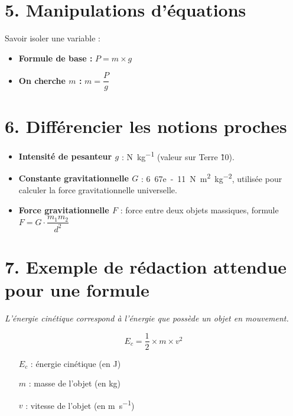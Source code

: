 \documentclass[12pt]{article}
\begin{document}
\section*{5. Manipulations d'équations}
Savoir isoler une variable :
\begin{itemize}[label=--]
  \item \textbf{Formule de base :} $P = m \times g$
  \item \textbf{On cherche $m$ :} \quad $m = \dfrac{P}{g}$
\end{itemize}

\section*{6. Différencier les notions proches}
\begin{itemize}[label=--]
  \item \textbf{Intensité de pesanteur $g$} : \si{\newton\per\kilogram} (valeur sur Terre \~10).
  \item \textbf{Constante gravitationnelle $G$} : \si{6.67e-11\newton\meter\squared\per\kilogram\squared}, utilisée pour calculer la force gravitationnelle universelle.
  \item \textbf{Force gravitationnelle $F$} : force entre deux objets massiques, formule $F = G \cdot \dfrac{m_1 m_2}{d^2}$
\end{itemize}

\section*{7. Exemple de rédaction attendue pour une formule}

\textit{L'énergie cinétique correspond à l'énergie que possède un objet en mouvement.}

\[
E_c = \frac{1}{2} \times m \times v^2
\]

\begin{adjustwidth}{4em}{1em}
\begin{itemize}[label=--, leftmargin=1.5em]
  \item[$E_c$] : énergie cinétique (en \si{\joule})
  \item[$m$] : masse de l’objet (en \si{\kilogram})
  \item[$v$] : vitesse de l’objet (en \si{\meter\per\second})
\end{itemize}
\end{adjustwidth}
\end{document}
